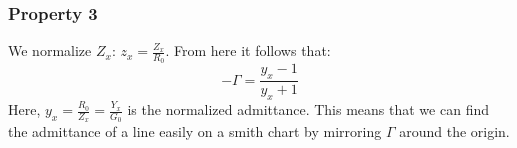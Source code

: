 \documentclass[../transmission.tex]{subfiles}
\begin{document}
			\subsubsection{Property 3}
				We normalize $Z_x$: $z_x = \frac{Z_x}{R_0}$. From here it follows that:
				\begin{equation}
					-\Gamma=\frac{y_x-1}{y_x+1}
				\end{equation}
				Here, $y_x = \frac{R_0}{Z_x} = \frac{Y_x}{G_0}$ is the normalized admittance. This means that we can find the admittance of a line easily on a smith chart by mirroring $\Gamma$ around the origin.
\end{document}
